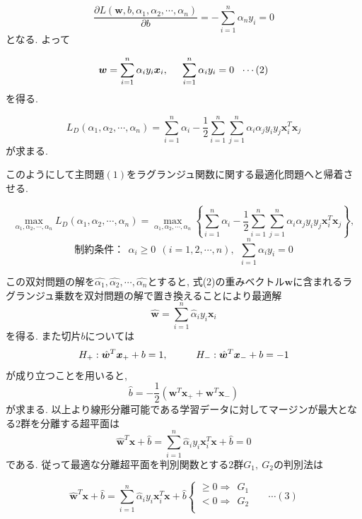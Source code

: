 \documentclass{jarticle}
\begin{document}
\[\frac{\partial L(\bm{w}, b, \alpha_1, \alpha_2, \cdots, \alpha_n)}{\partial b} = - \sum_{i=1}^n \alpha_n y_i = 0\]
となる. よって

\[\bm{w} = \sum_{i=1}^n \alpha_i y_i \bm{x}_i,\hspace{5mm} \sum_{i=1}^n \alpha_i y_i = 0\ \ \cdots(2)\]
 を得る.
 
\[L_D (\alpha_1, \alpha_2, \cdots, \alpha_n) =  \sum_{i=1}^n \alpha_i  - \frac{1}{2} \sum_{i=1}^n  \sum_{j=1}^n \alpha_i \alpha_j y_i y_j \bm{x}_i^T\bm{x}_j\]
 が求まる.
 
このようにして主問題$(1)$をラグランジュ関数に関する最適化問題へと帰着させる.
 
 \[\max_{\alpha_1, \alpha_2, \cdots, \alpha_n} L_D (\alpha_1, \alpha_2, \cdots, \alpha_n)  = \max_{\alpha_1, \alpha_2, \cdots, \alpha_n} \left\{ \sum_{i=1}^n \alpha_i  - \frac{1}{2} \sum_{i=1}^n  \sum_{j=1}^n \alpha_i \alpha_j y_i y_j \bm{x}_i^T\bm{x}_j \right\},\]
 \[\mbox{制約条件：}\ \ \alpha_i \geq 0 \ \ (i=1,2,\cdots,n),\ \ \sum_{i=1}^n \alpha_i y_i = 0\]
 
この双対問題の解を$\hat{\alpha_1}, \hat{\alpha_2}, \cdots, \hat{\alpha_n}$とすると, 式(2)の重みベクトル$\bm{w}$に含まれるラグランジュ乗数を双対問題の解で置き換えることにより最適解
\[\hat{\bm{w}} = \sum_{i=1}^n \hat{\alpha}_i y_i \bm{x}_i\]
を得る. また切片$b$については
\[H_+ : \hat{\bm{w}}^T \bm{x}_+ + b = 1,\hspace{10mm} H_- : \hat{\bm{w}}^T\bm{x}_- + b = -1\]
 が成り立つことを用いると, 
 \[\hat{b} = -\frac{1}{2}(\bm{w}^T \bm{x}_+ + \bm{w}^T \bm{x}_-)\]
 が求まる.
 以上より線形分離可能である学習データに対してマージンが最大となる2群を分離する超平面は
 \[\hat{\bm{w}}^T \bm{x} + \hat{b} = \sum_{i=1}^n \hat{\alpha}_i y_i \bm{x}_i^T \bm{x} + \hat{b} = 0\]
である. 従って最適な分離超平面を判別関数とする2群$G_1,\ G_2$の判別法は
 
\begin{equation*}
\hat{\bm{w}}^T \bm{x} + \hat{b} = \sum_{i=1}^n \hat{\alpha}_i y_i \bm{x}_i^T \bm{x} + \hat{b} 
     \left\{
     \begin{aligned}
       \geq 0 \Longrightarrow\ \ G_1\\
       < 0 \Longrightarrow\ \ G_2\\
     \end{aligned}
     \right.\ \ \ \ \ \ \ \cdots(3)
 \end{equation*}
\end{document}
